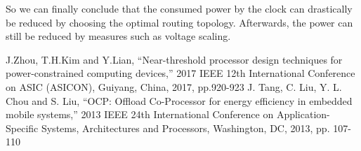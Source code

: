 \documentclass[conference]{IEEEtran}
\begin{document}
So we can finally conclude that the consumed power by the clock can drastically be reduced by choosing the optimal routing topology. Afterwards, the power can still be reduced by measures such as voltage scaling.




\begin{thebibliography}{00}
 J.Zhou, T.H.Kim and Y.Lian, ``Near-threshold processor design techniques for power-constrained 
computing devices,'' 2017 IEEE 12th International Conference on ASIC (ASICON), Guiyang, China, 2017, pp.920-923
 J. Tang, C. Liu, Y. L. Chou and S. Liu, ``OCP: Offload Co-Processor
for energy efficiency in embedded mobile systems,'' 2013 IEEE 24th International Conference on Application-Specific 
Systems, Architectures and Processors, Washington, DC, 2013, pp. 107-110
\end{thebibliography}
\end{document}
